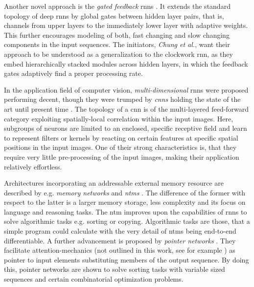 Another novel approach is the \textit{gated feedback} \glspl{rnn} \cite{ChuCa2015}.
It extends the standard topology of deep \glspl{rnn} by global gates between hidden layer pairs, that is, channels from upper layers to the immediately lower layer with adaptive weights.
This further encourages modeling of both, fast changing and slow changing components in the input sequences.
The initiators, \textit{Chung et al.}, want their approach to be understood as a generalization to the clockwork \gls{rnn}, as they embed hierarchically stacked modules across hidden layers, in which the feedback gates adaptively find a proper processing rate.

In the application field of computer vision, \textit{multi-dimensional} \glspl{rnn} were proposed \cite{GraFe2007} performing decent, though they were trumped by \textit{\glspl{cnn}} holding the state of the art until present time \cite{KriSu2012}.
The topology of a \gls{cnn} is of the multi-layered feed-forward category exploiting spatially-local correlation within the input images.
Here, subgroups of neurons are limited to an enclosed, specific receptive field and learn to represent filters or kernels by reacting on certain features at specific spatial positions in the input images. 
One of their strong characteristics is, that they require very little pre-processing of the input images, making their application relatively effortless.

Architectures incorporating an addressable external memory resource are described by e.g. \textit{memory networks} \cite{WesCho2014} and \textit{\glspl{ntm}} \cite{GraWa2014}.
The difference of the former with respect to the latter is a larger memory storage, less complexity and its focus on language and reasoning tasks.
The \gls{ntm} improves upon the capabilities of \glspl{rnn} to solve algorithmic tasks e.g. sorting or copying.
Algorithmic tasks are those, that a simple program could calculate with the very detail of \glspl{ntm} being end-to-end differentiable.
A further advancement is proposed by \textit{pointer networks} \cite{ViFo2015}.
They facilitate attention-mechanics (not outlined in this work, see for example \cite{ChoBa2015, XuBa2015}) as pointer to input elements substituting members of the output sequence.
By doing this, pointer networks are shown to solve sorting tasks with variable sized sequences and certain combinatorial optimization problems.

